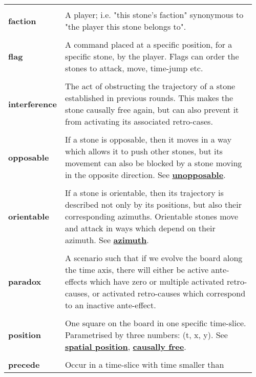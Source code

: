 {\begin{longtable}{ R{0.15\linewidth}  L{0.81\linewidth}  }
 \\* \textbf{faction} & \parbox[t]{\linewidth}{A player; i.e. "this stone's faction" synonymous to "the player this stone belongs to".}\\
 \\* \textbf{flag} & \parbox[t]{\linewidth}{A command placed at a specific position, for a specific stone, by the player. Flags can order the stones to attack, move, time-jump etc.}\\
 \\* \textbf{interference} & \parbox[t]{\linewidth}{The act of obstructing the trajectory of a stone established in previous rounds. This makes the stone causally free again, but can also prevent it from activating its associated retro-cases.}\\
 \\* \textbf{opposable} & \parbox[t]{\linewidth}{If a stone is opposable, then it moves in a way which allows it to push other stones, but its movement can also be blocked by a stone moving in the opposite direction. See \hyperref[glossary:unopposable]{\textbf{unopposable}}.}\\
 \\* \textbf{orientable} & \parbox[t]{\linewidth}{If a stone is orientable, then its trajectory is described not only by its positions, but also their corresponding azimuths. Orientable stones move and attack in ways which depend on their azimuth. See \hyperref[glossary:azimuth]{\textbf{azimuth}}.}\\
 \\* \textbf{paradox} & \parbox[t]{\linewidth}{A scenario such that if we evolve the board along the time axis, there will either be active ante-effects which have zero or multiple activated retro-causes, or activated retro-causes which correspond to an inactive ante-effect.}\\
 \\* \textbf{position} & \parbox[t]{\linewidth}{One square on the board in one specific time-slice. Parametrised by three numbers: (t, x, y). See \hyperref[glossary:spatial position]{\textbf{spatial position}}, \hyperref[glossary:causally free]{\textbf{causally free}}.}\\
 \\* \textbf{precede} & \parbox[t]{\linewidth}{Occur in a time-slice with time smaller than}\\

\end{longtable}}
